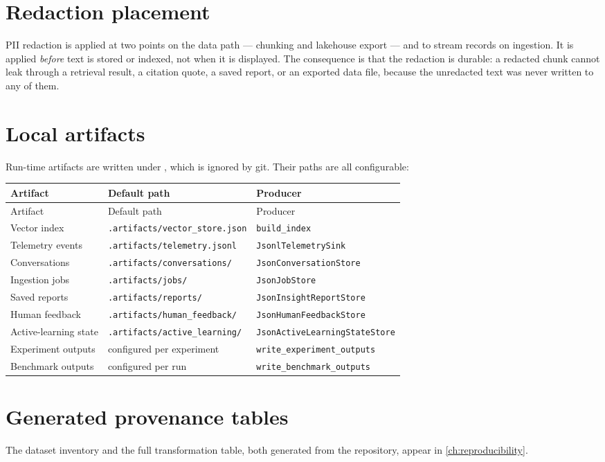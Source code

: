 \section{Redaction placement}

PII redaction is applied at two points on the data path --- chunking and
lakehouse export --- and to stream records on ingestion. It is applied
\emph{before} text is stored or indexed, not when it is displayed. The
consequence is that the redaction is durable: a redacted chunk cannot leak
through a retrieval result, a citation quote, a saved report, or an exported
data file, because the unredacted text was never written to any of them.

\section{Local artifacts}

Run-time artifacts are written under , which is ignored by
git. Their paths are all configurable:

\begin{longtable}{p{} p{} p{}}
\toprule
Artifact & Default path & Producer \\
\midrule
\endfirsthead
\toprule
Artifact & Default path & Producer \\
\midrule
\endhead
\bottomrule
\endlastfoot
Vector index & \texttt{.artifacts/vector\_store.json} & \texttt{build\_index} \\
Telemetry events & \texttt{.artifacts/telemetry.jsonl} & \texttt{JsonlTelemetrySink} \\
Conversations & \texttt{.artifacts/conversations/} & \texttt{JsonConversationStore} \\
Ingestion jobs & \texttt{.artifacts/jobs/} & \texttt{JsonJobStore} \\
Saved reports & \texttt{.artifacts/reports/} & \texttt{JsonInsightReportStore} \\
Human feedback & \texttt{.artifacts/human\_feedback/} & \texttt{JsonHumanFeedbackStore} \\
Active-learning state & \texttt{.artifacts/active\_learning/} & \texttt{JsonActiveLearningStateStore} \\
Experiment outputs & configured per experiment & \texttt{write\_experiment\_outputs} \\
Benchmark outputs & configured per run & \texttt{write\_benchmark\_outputs} \\
\end{longtable}

\section{Generated provenance tables}

The dataset inventory and the full transformation table, both generated from
the repository, appear in \cref{ch:reproducibility}.
